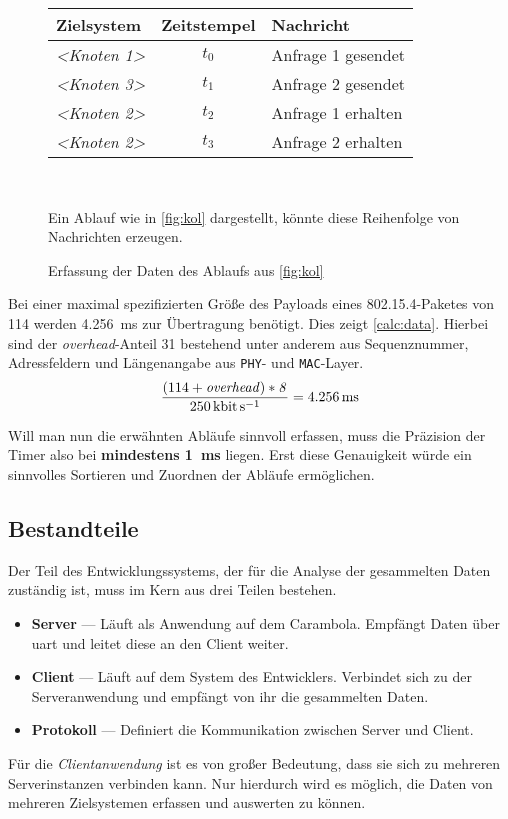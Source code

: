 \begin{figure}[!ht]
\centering
\par\begin{tabu}{l c l}
Zielsystem & Zeitstempel & Nachricht\\
\hline
\emph{<Knoten 1>} & \emph{$t_0$} & Anfrage 1 gesendet\\ 
\emph{<Knoten 3>} & \emph{$t_1$} & Anfrage 2 gesendet\\
\emph{<Knoten 2>} & \emph{$t_2$} & Anfrage 1 erhalten\\
\emph{<Knoten 2>} & \emph{$t_3$} & Anfrage 2 erhalten\\
\hline
\end{tabu}\\
\caption{Erfassung der Daten des Ablaufs aus \autoref{fig:kol}}{Ein Ablauf
wie in \autoref{fig:kol} dargestellt, könnte diese Reihenfolge von
Nachrichten erzeugen.}
\label{fig:kolmsg}
\end{figure}

Bei einer maximal spezifizierten Größe des Payloads eines
802.15.4-Paketes von \SI{114}{\byte} werden \SI{4.256}{\milli\second}
zur Übertragung benötigt. Dies zeigt \autoref{calc:data}. Hierbei sind der
\emph{overhead}-Anteil \SI{31}{\byte} bestehend unter anderem aus
Sequenznummer, Adressfeldern und Längenangabe aus \texttt{PHY}- und
\texttt{MAC}-Layer.
\begin{align}\label{calc:data}
\frac{(114+\mathit{overhead)*8}}{\SI{250}{\kilo\bit\per\second}}=\SI{4.256}{\milli\second}
\end{align}

Will man nun die erwähnten Abläufe sinnvoll erfassen, muss die Präzision der
Timer also bei \textbf{mindestens \SI{1}{\milli\second}} liegen. Erst diese
Genauigkeit würde ein sinnvolles Sortieren und Zuordnen der Abläufe ermöglichen.

\subsection{Bestandteile}\label{subs:best}
\begin{minipage}[c]{\textwidth}
Der Teil des Entwicklungssystems, der für die Analyse der gesammelten Daten
zuständig ist, muss im Kern aus drei Teilen bestehen.
\begin{itemize}
  \item \textbf{Server} --- Läuft als Anwendung auf dem Carambola. Empfängt
  Daten über \gls{uart} und leitet diese an den Client weiter.
  \item \textbf{Client} --- Läuft auf dem System des Entwicklers. Verbindet sich
  zu der Serveranwendung und empfängt von ihr die gesammelten Daten.
  \item \textbf{Protokoll} --- Definiert die Kommunikation zwischen Server und
  Client.
\end{itemize}
\end{minipage}\par
Für die \emph{Clientanwendung} ist es von großer Bedeutung, dass sie sich zu
mehreren Serverinstanzen verbinden kann. Nur hierdurch wird es möglich, die
Daten von mehreren Zielsystemen erfassen und auswerten zu können.

